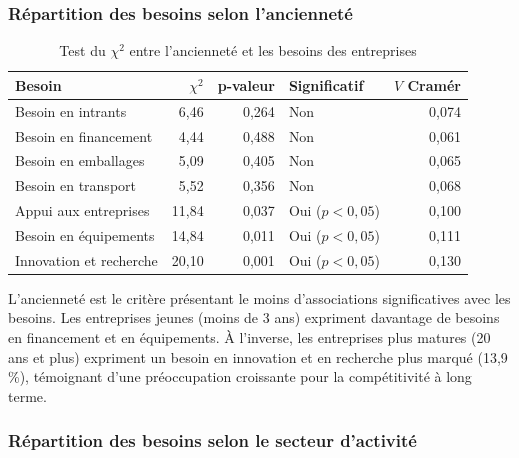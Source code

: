 \documentclass[12pt, a4paper, oneside]{report}
\begin{document}
\subsubsection{Répartition des besoins selon l'ancienneté}

\begin{table}[H]
  \centering
  \caption{Test du $\chi^2$ entre l'ancienneté et les besoins des entreprises}
  \label{tab:khi2_anciennete}
  \renewcommand{\arraystretch}{1.4}
  \begin{tabularx}{\textwidth}{>{\raggedright\arraybackslash}X r r >{\centering\arraybackslash}p{2.8cm} r}
    \toprule
    \rowcolor{primary!15}
    \textbf{Besoin} & \textbf{$\chi^2$} & \textbf{p-valeur} & \textbf{Significatif} & \textbf{$V$ Cramér} \\
    \midrule
    Besoin en intrants        &  6,46 & 0,264  & Non  & 0,074 \\
    \rowcolor{lightgray}
    Besoin en financement     &  4,44 & 0,488  & Non  & 0,061 \\
    Besoin en emballages      &  5,09 & 0,405  & Non  & 0,065 \\
    \rowcolor{lightgray}
    Besoin en transport       &  5,52 & 0,356  & Non  & 0,068 \\
    Appui aux entreprises     & 11,84 & 0,037  & Oui ($p < 0{,}05$) & 0,100 \\
    \rowcolor{lightgray}
    Besoin en équipements     & 14,84 & 0,011  & Oui ($p < 0{,}05$) & 0,111 \\
    Innovation et recherche   & 20,10 & 0,001  & Oui ($p < 0{,}05$) & 0,130 \\
    \bottomrule
  \end{tabularx}
\end{table}

L'ancienneté est le critère présentant le moins d'associations significatives avec les besoins. Les entreprises jeunes (moins de 3 ans) expriment davantage de besoins en financement et en équipements. À l'inverse, les entreprises plus matures (20 ans et plus) expriment un besoin en innovation et en recherche plus marqué (13,9\,\%), témoignant d'une préoccupation croissante pour la compétitivité à long terme.

\subsubsection{Répartition des besoins selon le secteur d'activité}
\end{document}
